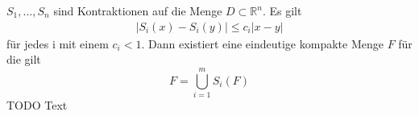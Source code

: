 $S_1,...,S_n$ sind Kontraktionen auf die Menge $D \subset \mathbb{R}^n$. Es gilt
\begin{align}
	|S_i(x) - S_i(y)| \leq c_i|x - y|
\end{align}
für jedes i mit einem $c_i < 1$. Dann existiert eine eindeutige kompakte Menge $F$ für die gilt
\begin{equation}
	F = \bigcup\limits_{i = 1}^{m} S_i(F)
\end{equation}
TODO Text
